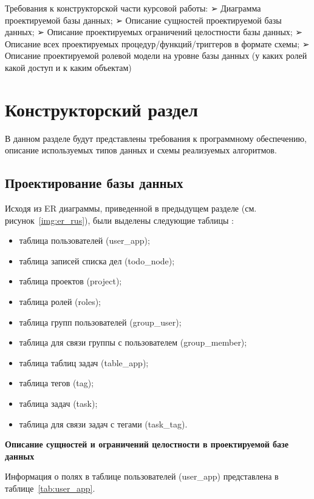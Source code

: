 Требования к конструкторской части курсовой работы:
➢ Диаграмма проектируемой базы данных;
➢ Описание сущностей проектируемой базы данных;
➢ Описание проектируемых ограничений целостности базы данных;
➢ Описание всех проектируемых процедур/функций/триггеров в формате схемы;
➢ Описание проектируемой ролевой модели на уровне базы данных (у каких ролей какой
доступ и к каким объектам)
\fi

\chapter{Конструкторский раздел}

В данном разделе будут представлены требования к программному обеспечению, описание используемых типов данных и схемы реализуемых алгоритмов.


\section{Проектирование базы данных}

Исходя из ER диаграммы, приведенной в предыдущем разделе (см. рисунок~\ref{img:er_rus}), были выделены следующие таблицы :

\begin{itemize}
	\item таблица пользователей (user\_app);
	\item таблица записей списка дел (todo\_node);
	\item таблица проектов (project);
	\item таблица ролей (roles);
	\item таблица групп пользователей (group\_user);
	\item таблица для связи группы с пользователем (group\_member);
	\item таблица таблиц задач (table\_app);
	\item таблица тегов (tag);
	\item таблица задач (task);
	\item таблица для связи задач с тегами (task\_tag).
\end{itemize}


\textbf{Описание сущностей и ограничений целостности в проектируемой базе данных} 

Информация о полях в таблице пользователей (user\_app) представлена в таблице~\ref{tab:user_app}.


